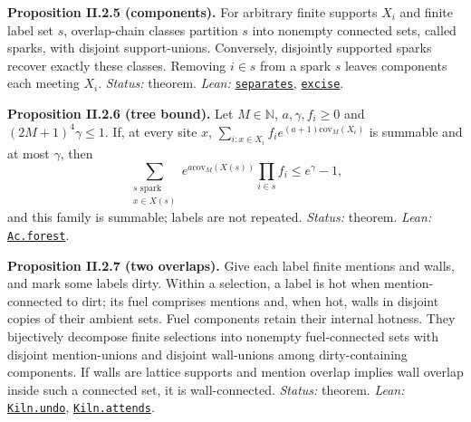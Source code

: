 \documentclass[
  letterpaper,
  11pt]{article}
\newcounter{none} %
\begin{document}
\textbf{Proposition II.2.5 (components).} For arbitrary finite supports
\(X_i\) and finite label set \(s\), overlap-chain classes partition
\(s\) into nonempty connected sets, called sparks, with disjoint
support-unions. Conversely, disjointly supported sparks recover exactly
these classes. Removing \(i\in s\) from a spark \(s\) leaves components
each meeting \(X_i\). \emph{Status:} theorem. \emph{Lean:}
\href{https://github.com/yang-mills-group/OpenAI-YM-20261028/blob/3456e5e75cf8d4cd558955a5c7638fba2d68f464/YM/Ac/Nodes.lean\#L79-L101}{\texttt{separates}},
\href{https://github.com/yang-mills-group/OpenAI-YM-20261028/blob/3456e5e75cf8d4cd558955a5c7638fba2d68f464/YM/Ac/Nodes.lean\#L103-L113}{\texttt{excise}}.

\textbf{Proposition II.2.6 (tree bound).} Let \(M\in\mathbb N\),
\(a,\gamma,f_i\ge0\) and \((2M+1)^4\gamma\le1\). If, at every site
\(x\), \(\sum_{i:x\in X_i}f_i e^{(a+1)\mathrm{cov}_M(X_i)}\) is summable
and at most \(\gamma\), then
\[\sum_{\substack{s\text{ spark}\\x\in X(s)}}e^{a\mathrm{cov}_M(X(s))}\prod_{i\in s}f_i\le e^\gamma-1,\]
and this family is summable; labels are not repeated. \emph{Status:}
theorem. \emph{Lean:}
\href{https://github.com/yang-mills-group/OpenAI-YM-20261028/blob/3456e5e75cf8d4cd558955a5c7638fba2d68f464/YM/Ac/Tree.lean\#L89-L127}{\texttt{Ac.forest}}.

\textbf{Proposition II.2.7 (two overlaps).} Give each label finite
mentions and walls, and mark some labels dirty. Within a selection, a
label is hot when mention-connected to dirt; its fuel comprises mentions
and, when hot, walls in disjoint copies of their ambient sets. Fuel
components retain their internal hotness. They bijectively decompose
finite selections into nonempty fuel-connected sets with disjoint
mention-unions and disjoint wall-unions among dirty-containing
components. If walls are lattice supports and mention overlap implies
wall overlap inside such a connected set, it is wall-connected.
\emph{Status:} theorem. \emph{Lean:}
\href{https://github.com/yang-mills-group/OpenAI-YM-20261028/blob/3456e5e75cf8d4cd558955a5c7638fba2d68f464/YM/Further/SHELL_BIRTH_49/Fusing/Coal.lean\#L210-L240}{\texttt{Kiln.undo}},
\href{https://github.com/yang-mills-group/OpenAI-YM-20261028/blob/3456e5e75cf8d4cd558955a5c7638fba2d68f464/YM/Further/SHELL_BIRTH_49/Fusing/Coal.lean\#L242-L253}{\texttt{Kiln.attends}}.
\end{document}
